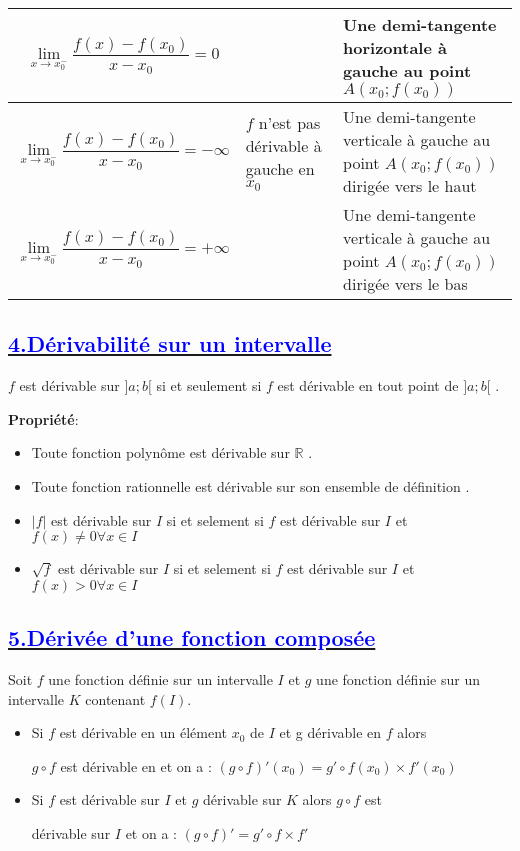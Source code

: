 \documentclass{article}
\begin{document}
\begin{table}[H]
\begin{tabular}{|>{\centering\arraybackslash}m{5cm}|>{\centering\arraybackslash}m{3cm}|>{\centering\arraybackslash}m{6cm}|}
\cline{1-1} \cline{3-3}
\[\lim_{x \to x_0^-} \frac{f(x) - f(x_0)}{x - x_0} = 0 \] &  & Une demi-tangente horizontale à gauche au point \( A \left(x_0; f(x_0)\right) \) \\
\hline
\[\lim_{x \to x_0^-} \frac{f(x) - f(x_0)}{x - x_0} = -\infty \] & \(f\) n'est pas dérivable à gauche en \(x_0\) & Une demi-tangente verticale à gauche au point \( A \left(x_0; f(x_0)\right) \) dirigée vers le haut \\
\cline{1-1} \cline{3-3}
\[\lim_{x \to x_0^-} \frac{f(x) - f(x_0)}{x - x_0} = +\infty \] &  & Une demi-tangente verticale à gauche au point \( A \left(x_0; f(x_0)\right) \) dirigée vers le bas \\
\hline
\end{tabular}
\end{table}
\subsection*{\underline{\textbf{\textcolor{blue}{4.Dérivabilité sur un intervalle }}}}
\( f \) est dérivable sur \( ]a ; b[ \) si et seulement si \( f \) est dérivable en tout point
de \( ]a ; b[ \) .

\textbf{Propriété}:
\begin{itemize}
\item Toute fonction polynôme est dérivable sur \( \mathbb{R} \) .
\item Toute fonction rationnelle est dérivable sur son ensemble de définition .
\item \(|f|\) est dérivable sur \( I \) si et selement si \( f \) est dérivable sur \( I \) et \( f(x)  \neq 0 \forall x \in  I \)
\item \(\sqrt{f}\) est dérivable sur \( I \) si et selement si \( f \) est dérivable sur \( I \) et \( f(x) >0 \forall x \in I \)
\end{itemize}
\subsection*{\underline{\textbf{\textcolor{blue}{5.Dérivée d’une fonction composée}}}}

Soit \( f \) une fonction définie sur un intervalle \( I \) et \( g \) une fonction définie sur un intervalle \( K \) contenant \( f(I) \).

\begin{itemize}
\item Si \( f \) est dérivable en un élément \( x_{0} \) de \( I \) et g dérivable en \( f \) alors 

\( g\circ f \) est dérivable en et on a : \( (g\circ f)'(x_{0}) = g' \circ f(x_{0}) \times  f'(x_{0}) \) 

\item Si \( f \) est dérivable sur \( I \) et \( g \) dérivable sur \( K \) alors \( g\circ f \) est

dérivable sur \( I \) et on a : \( (g\circ f)' = g' \circ f \times  f' \)

\end{itemize}
\end{document}
